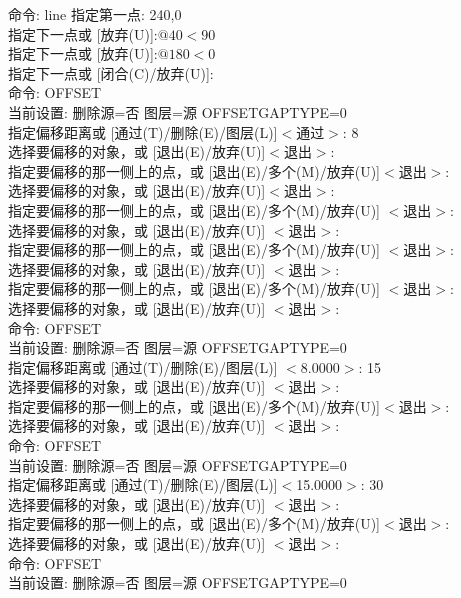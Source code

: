 \noindent
命令: line 指定第一点: 240,0\\
指定下一点或 [放弃(U)]:$ @40<90$\\
指定下一点或 [放弃(U)]:$ @180<0$\\
指定下一点或 [闭合(C)/放弃(U)]:\\
命令: OFFSET\\
当前设置: 删除源=否  图层=源  OFFSETGAPTYPE=0\\
指定偏移距离或 [通过(T)/删除(E)/图层(L)]$ <$通过$>$:  8\\
选择要偏移的对象，或 [退出(E)/放弃(U)]$ <$退出$>$:\\
指定要偏移的那一侧上的点，或 [退出(E)/多个(M)/放弃(U)]$ <$退出$>$:\\
选择要偏移的对象，或 [退出(E)/放弃(U)]$ <$退出$>$:\\
指定要偏移的那一侧上的点，或 [退出(E)/多个(M)/放弃(U)] $<$退出$>$:\\
选择要偏移的对象，或 [退出(E)/放弃(U)] $<$退出$>$:\\
指定要偏移的那一侧上的点，或 [退出(E)/多个(M)/放弃(U)] $<$退出$>$:\\
选择要偏移的对象，或 [退出(E)/放弃(U)] $<$退出$>$:\\
指定要偏移的那一侧上的点，或 [退出(E)/多个(M)/放弃(U)] $<$退出$>$:\\
选择要偏移的对象，或 [退出(E)/放弃(U)] $<$退出$>$:\\
命令: OFFSET\\
当前设置: 删除源=否  图层=源  OFFSETGAPTYPE=0\\
指定偏移距离或 [通过(T)/删除(E)/图层(L)] $<$8.0000$>$:  15\\
选择要偏移的对象，或 [退出(E)/放弃(U)] $<$退出$>$:\\
指定要偏移的那一侧上的点，或 [退出(E)/多个(M)/放弃(U)]$ <$退出$>$:\\
选择要偏移的对象，或 [退出(E)/放弃(U)] $<$退出$>$:\\
命令:  OFFSET\\
当前设置: 删除源=否  图层=源  OFFSETGAPTYPE=0\\
指定偏移距离或 [通过(T)/删除(E)/图层(L)]$ <$15.0000$>$:  30\\
选择要偏移的对象，或 [退出(E)/放弃(U)] $<$退出$>$:\\
指定要偏移的那一侧上的点，或 [退出(E)/多个(M)/放弃(U)]$ <$退出$>$:\\
选择要偏移的对象，或 [退出(E)/放弃(U)] $<$退出$>$:\\
命令:  OFFSET\\
当前设置: 删除源=否  图层=源  OFFSETGAPTYPE=0\\
